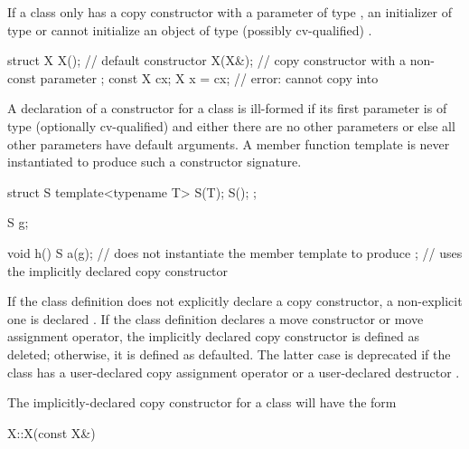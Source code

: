 \pnum
\begin{note}
If a class
only has a copy constructor with a parameter of type
,
an initializer of type
or
cannot initialize an object of type
(possibly
cv-qualified)
.
\begin{example}

\begin{codeblock}
struct X {
  X();              // default constructor
  X(X&);            // copy constructor with a non-const parameter
};
const X cx;
X x = cx;           // error:  cannot copy  into 
\end{codeblock}
\end{example}
\end{note}

\pnum
A declaration of a constructor for a class
is ill-formed if its first parameter is of type (optionally cv-qualified)
and either there are no other parameters or else all other parameters have
default arguments.
A member function template is never instantiated to
produce such a constructor signature.
\begin{example}
\begin{codeblock}
struct S {
  template<typename T> S(T);
  S();
};

S g;

void h() {
  S a(g);           // does not instantiate the member template to produce ;
                    // uses the implicitly declared copy constructor
}
\end{codeblock}
\end{example}

\pnum
If the class definition does not explicitly declare a copy constructor,
a non-explicit one is declared .
If the class definition declares a move
constructor or move assignment operator, the implicitly declared copy
constructor is defined as deleted; otherwise, it is defined as
defaulted.
The latter case is deprecated if the class has a user-declared copy assignment
operator or a user-declared destructor .

\pnum
The implicitly-declared copy constructor for a class
will have the form

\begin{codeblock}
X::X(const X&)
\end{codeblock}

